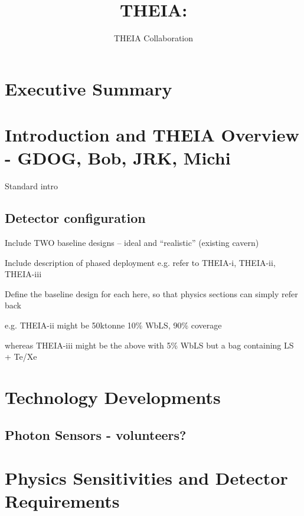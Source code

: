 \documentclass[11pt,prd,letterpaper,amsmath,amssymb,final,nofootinbib
,unsortedaddress,superscriptaddress
]{revtex4-1}
\begin{document}
\title{ THEIA: \\ {\small }}

\author{THEIA Collaboration}

\maketitle

\section*{Executive Summary}

\newpage

\tableofcontents
\setcounter{tocdepth}{5}
\newpage

\section{Introduction and THEIA Overview - GDOG, Bob, JRK, Michi}

Standard intro


\subsection{Detector configuration}
Include TWO baseline designs -- ideal and ``realistic'' (existing cavern)

Include description of phased deployment
e.g. refer to THEIA-i, THEIA-ii, THEIA-iii

Define the baseline design for each here, so that physics sections can simply refer back

e.g. THEIA-ii might be 50ktonne 10\% WbLS, 90\% coverage

whereas THEIA-iii might be the above with 5\% WbLS but a bag containing LS + Te/Xe

\section{Technology Developments}

\subsection{Photon Sensors - \bf volunteers?}



\section{Physics Sensitivities and Detector Requirements}\label{s:physics}
\end{document}
